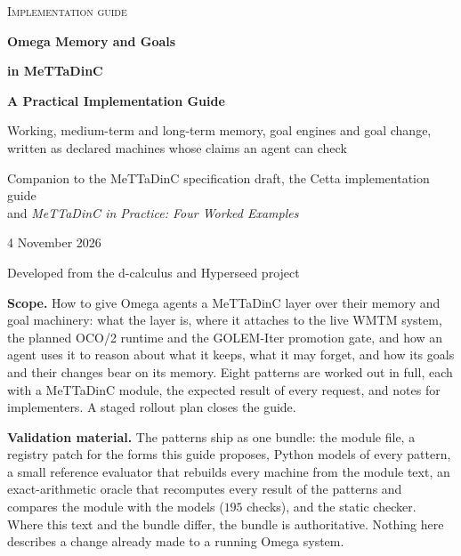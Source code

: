 \documentclass[11pt]{article}
\theoremstyle{definition}
\theoremstyle{plain}
\newcommand{\nchecks}{195}
\begin{document}
\hypersetup{pageanchor=false}
\begin{titlepage}
\thispagestyle{empty}
\vspace*{2.2cm}
{\color{dcblue}\large\scshape Implementation guide\par}
\vspace{1.4cm}
{\color{dcblue}\fontsize{28}{34}\selectfont\bfseries Omega Memory and Goals\par}
\vspace{0.3cm}
{\color{dcblue}\fontsize{28}{34}\selectfont\bfseries in MeTTaDinC\par}
\vspace{0.7cm}
{\LARGE\bfseries A Practical Implementation Guide\par}
\vspace{0.7cm}
{\large Working, medium-term and long-term memory, goal engines and goal change,\\ written as
declared machines whose claims an agent can check\par}
\vspace{1.6cm}
{\large Companion to the MeTTaDinC specification draft, the Cetta implementation guide\\ and
\emph{MeTTaDinC in Practice: Four Worked Examples}\par}
\vspace{0.4cm}
{4 November 2026\par}
\vspace{0.8cm}
{Developed from the d-calculus and Hyperseed project\par}
\vfill
\noindent\begin{minipage}{\textwidth}
\small
{\color{dcblue}\bfseries Scope.} How to give Omega agents a MeTTaDinC layer over their memory and
goal machinery: what the layer is, where it attaches to the live WMTM system, the planned OCO/2
runtime and the GOLEM-Iter promotion gate, and how an agent uses it to reason about what it keeps,
what it may forget, and how its goals and their changes bear on its memory. Eight patterns are
worked out in full, each with a MeTTaDinC module, the expected result of every request, and notes
for implementers. A staged rollout plan closes the guide.

\smallskip
{\color{dcblue}\bfseries Validation material.} The patterns ship as one bundle: the module file,
a registry patch for the forms this guide proposes, Python models of every pattern, a small
reference evaluator that rebuilds every machine from the module text, an exact-arithmetic oracle
that recomputes every result of the patterns and compares the module with the models ($\nchecks$
checks), and the static checker. Where this text and the bundle differ, the bundle is
authoritative. Nothing here describes a change already made to a running Omega system.
\end{minipage}
\end{titlepage}
\hypersetup{pageanchor=true}
\end{document}

